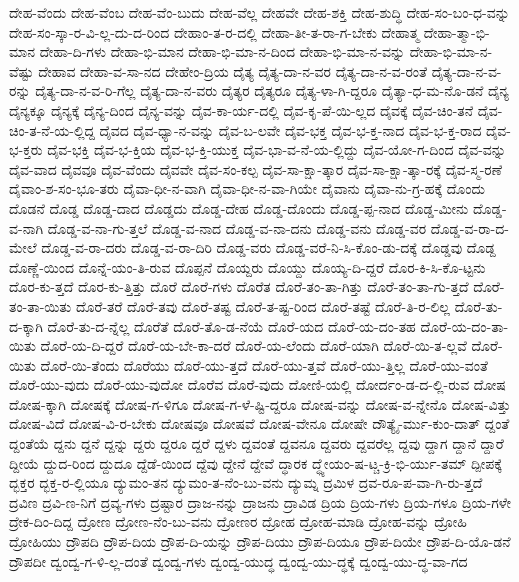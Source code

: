 {ದೇಹ-ವೆಂದು
ದೇಹ-ವೆಂಬ
ದೇಹ-ವೆಂ-ಬುದು
ದೇಹ-ವೆಲ್ಲ
ದೇಹವೇ
ದೇಹ-ಶಕ್ತಿ
ದೇಹ-ಶುದ್ಧಿ
ದೇಹ-ಸಂ-ಬಂ-ಧ-ವನ್ನು
ದೇಹ-ಸಂ-ಸ್ಕಾ-ರ-ವಿ-ಲ್ಲ-ದು-ದ-ರಿಂದ
ದೇಹಾಂ-ತ-ರ-ದಲ್ಲಿ
ದೇಹಾ-ತೀ-ತ-ರಾ-ಗ-ಬೇಕು
ದೇಹಾತ್ಮ
ದೇಹಾ-ತ್ಮಾ-ಭಿ-ಮಾನ
ದೇಹಾ-ದಿ-ಗಳು
ದೇಹಾ-ಭಿ-ಮಾನ
ದೇಹಾ-ಭಿ-ಮಾ-ನ-ದಿಂದ
ದೇಹಾ-ಭಿ-ಮಾ-ನ-ವನ್ನು
ದೇಹಾ-ಭಿ-ಮಾ-ನ-ವೆಷ್ಟು
ದೇಹಾವ
ದೇಹಾ-ವ-ಸಾ-ನದ
ದೇಹೇಂ-ದ್ರಿಯ
ದೈತ್ಯ
ದೈತ್ಯ-ದಾ-ನ-ವರ
ದೈತ್ಯ-ದಾ-ನ-ವ-ರಂತೆ
ದೈತ್ಯ-ದಾ-ನ-ವ-ರನ್ನು
ದೈತ್ಯ-ದಾ-ನ-ವ-ರಿ-ಗೆಲ್ಲ
ದೈತ್ಯ-ದಾ-ನ-ವರು
ದೈತ್ಯರ
ದೈತ್ಯರೂ
ದೈತ್ಯ-ಳಾ-ಗಿ-ದ್ದರೂ
ದೈತ್ಯಾ-ಧ-ಮ-ನೊ-ಡನೆ
ದೈನ್ಯ
ದೈನ್ಯಕ್ಕೂ
ದೈನ್ಯಕ್ಕೆ
ದೈನ್ಯ-ದಿಂದ
ದೈನ್ಯ-ವನ್ನು
ದೈವ-ಕಾ-ರ್ಯ-ದಲ್ಲಿ
ದೈವ-ಕೃ-ಪೆ-ಯಿ-ಲ್ಲದ
ದೈವಕ್ಕೆ
ದೈವ-ಚಿಂ-ತನೆ
ದೈವ-ಚಿಂ-ತ-ನೆ-ಯ-ಲ್ಲಿದ್ದ
ದೈವದ
ದೈವ-ಧ್ಯಾ-ನ-ವನ್ನು
ದೈವ-ಬ-ಲವೇ
ದೈವ-ಭಕ್ತ
ದೈವ-ಭ-ಕ್ತ-ನಾದ
ದೈವ-ಭ-ಕ್ತ-ರಾದ
ದೈವ-ಭ-ಕ್ತರು
ದೈವ-ಭಕ್ತಿ
ದೈವ-ಭ-ಕ್ತಿಯ
ದೈವ-ಭ-ಕ್ತಿ-ಯುಕ್ತ
ದೈವ-ಭಾ-ವ-ನೆ-ಯ-ಲ್ಲಿದ್ದು
ದೈವ-ಯೋ-ಗ-ದಿಂದ
ದೈವ-ವನ್ನು
ದೈವ-ವಾದ
ದೈವವೂ
ದೈವ-ವೆಂದು
ದೈವವೇ
ದೈವ-ಸಂ-ಕಲ್ಪ
ದೈವ-ಸಾ-ಕ್ಷಾ-ತ್ಕಾರ
ದೈವ-ಸಾ-ಕ್ಷಾ-ತ್ಕಾ-ರಕ್ಕೆ
ದೈವ-ಸ್ಮ-ರಣೆ
ದೈವಾಂ-ಶ-ಸಂ-ಭೂ-ತರು
ದೈವಾ-ಧೀ-ನ-ವಾಗಿ
ದೈವಾ-ಧೀ-ನ-ವಾ-ಗಿಯೇ
ದೈವಾನು
ದೈವಾ-ನು-ಗ್ರ-ಹಕ್ಕೆ
ದೊಂದು
ದೊಡನೆ
ದೊಡ್ಡ
ದೊಡ್ಡ-ದಾದ
ದೊಡ್ಡದು
ದೊಡ್ಡ-ದೇಹ
ದೊಡ್ಡ-ದೊಂದು
ದೊಡ್ಡ-ಪ್ಪ-ನಾದ
ದೊಡ್ಡ-ಮೀನು
ದೊಡ್ಡ-ವ-ನಾಗಿ
ದೊಡ್ಡ-ವ-ನಾ-ಗು-ತ್ತಲೆ
ದೊಡ್ಡ-ವ-ನಾದ
ದೊಡ್ಡ-ವ-ನಾ-ದನು
ದೊಡ್ಡ-ವನು
ದೊಡ್ಡ-ವರ
ದೊಡ್ಡ-ವ-ರಾ-ದ-ಮೇಲೆ
ದೊಡ್ಡ-ವ-ರಾ-ದರು
ದೊಡ್ಡ-ವ-ರಾ-ದಿರಿ
ದೊಡ್ಡ-ವರು
ದೊಡ್ಡ-ವರೆ-ನಿ-ಸಿ-ಕೊಂ-ಡು-ದಕ್ಕೆ
ದೊಡ್ಡವು
ದೊಡ್ದ
ದೊಣ್ಣೆ-ಯಿಂದ
ದೊನ್ನೆ-ಯಂ-ತಿ-ರುವ
ದೊಪ್ಪನೆ
ದೊಯ್ದರು
ದೊಯ್ದು
ದೊಯ್ಯ-ದಿ-ದ್ದರೆ
ದೊರ-ಕಿ-ಸಿ-ಕೊ-ಟ್ಟನು
ದೊರ-ಕು-ತ್ತದೆ
ದೊರ-ಕು-ತ್ತಿತ್ತು
ದೊರೆ
ದೊರೆ-ಗಳು
ದೊರೆತ
ದೊರೆ-ತಂ-ತಾ-ಗಿತ್ತು
ದೊರೆ-ತಂ-ತಾ-ಗು-ತ್ತದೆ
ದೊರೆ-ತಂ-ತಾ-ಯಿತು
ದೊರೆ-ತರೆ
ದೊರೆ-ತವು
ದೊರೆ-ತಷ್ಟ
ದೊರೆ-ತ-ಷ್ಟ-ರಿಂದ
ದೊರೆ-ತಷ್ಟೆ
ದೊರೆ-ತಿ-ರ-ಲಿಲ್ಲ
ದೊರೆ-ತು-ದ-ಕ್ಕಾಗಿ
ದೊರೆ-ತು-ದ-ನ್ನೆಲ್ಲ
ದೊರೆತೆ
ದೊರೆ-ತೊ-ಡ-ನೆಯೆ
ದೊರೆ-ಯದ
ದೊರೆ-ಯ-ದಂ-ತಹ
ದೊರೆ-ಯ-ದಂ-ತಾ-ಯಿತು
ದೊರೆ-ಯ-ದಿ-ದ್ದರೆ
ದೊರೆ-ಯ-ಬೇ-ಕಾ-ದರೆ
ದೊರೆ-ಯ-ಲೆಂದು
ದೊರೆ-ಯಾಗಿ
ದೊರೆ-ಯಿ-ತ-ಲ್ಲವೆ
ದೊರೆ-ಯಿತು
ದೊರೆ-ಯಿ-ತೆಂದು
ದೊರೆಯು
ದೊರೆ-ಯು-ತ್ತದೆ
ದೊರೆ-ಯು-ತ್ತವೆ
ದೊರೆ-ಯು-ತ್ತಿಲ್ಲ
ದೊರೆ-ಯು-ವಂತೆ
ದೊರೆ-ಯು-ವುದು
ದೊರೆ-ಯು-ವುದೋ
ದೊರೆವ
ದೊರೆ-ವುದು
ದೋಣಿ-ಯಲ್ಲಿ
ದೋರ್ದಂ-ಡ-ದ-ಲ್ಲಿ-ರುವ
ದೋಷ
ದೋಷ-ಕ್ಕಾಗಿ
ದೋಷಕ್ಕೆ
ದೋಷ-ಗ-ಳಿಗೂ
ದೋಷ-ಗ-ಳೆ-ಷ್ಟಿ-ದ್ದರೂ
ದೋಷ-ವನ್ನು
ದೋಷ-ವ-ನ್ನೇನೊ
ದೋಷ-ವಿತ್ತು
ದೋಷ-ವಿದೆ
ದೋಷ-ವಿ-ರ-ಬೇಕು
ದೋಷವೂ
ದೋಷವೆ
ದೋಷ-ವೇನೂ
ದೋಷೇ
ದೌತ್ಯೈ-ರ್ಮು-ಕುಂ-ದಾತ್
ದ್ದಂತೆ
ದ್ದಂತೆಯೆ
ದ್ದನು
ದ್ದನೆ
ದ್ದನ್ನು
ದ್ದರು
ದ್ದರೂ
ದ್ದರೆ
ದ್ದಳು
ದ್ದವಂತೆ
ದ್ದವನೂ
ದ್ದವರು
ದ್ದವರೆಲ್ಲ
ದ್ದವು
ದ್ದಾಗ
ದ್ದಾನೆ
ದ್ದಾರೆ
ದ್ದೀಯೆ
ದ್ದುದ-ರಿಂದ
ದ್ದುದೂ
ದ್ದೆಡೆ-ಯಿಂದ
ದ್ದೆವು
ದ್ದೇನೆ
ದ್ದೇವೆ
ದ್ಧಾರಕ
ದ್ಧ್ಯೇಯಂ-ಷ-ಟ್ಚ-ಕ್ರಿ-ಭಿ-ರ್ಯು-ತಮ್
ದ್ಪೀಪಕ್ಕೆ
ದ್ಭಕ್ತರ
ದ್ಭಕ್ತ-ರ-ಲ್ಲಿಯೂ
ದ್ಯುಮಂ-ತನ
ದ್ಯುಮಂ-ತ-ನೆಂ-ಬು-ವನು
ದ್ಯುಮ್ನ
ದ್ರಮಿಳ
ದ್ರವ-ರೂ-ಪ-ವಾ-ಗಿ-ರು-ತ್ತದೆ
ದ್ರವಿಣ
ದ್ರವಿ-ಣ-ನಿಗೆ
ದ್ರವ್ಯ-ಗಳು
ದ್ರಷ್ಟಾರ
ದ್ರಾಜ-ನನ್ನು
ದ್ರಾಜನು
ದ್ರಾವಿಡ
ದ್ರಿಯ
ದ್ರಿಯ-ಗಳು
ದ್ರಿಯ-ಗಳೂ
ದ್ರಿಯ-ಗಳೇ
ದ್ರೇಕ-ದಿಂ-ದಿದ್ದ
ದ್ರೋಣ
ದ್ರೋಣ-ನೆಂ-ಬು-ವನು
ದ್ರೋಣರ
ದ್ರೋಹ
ದ್ರೋಹ-ಮಾಡಿ
ದ್ರೋಹ-ವನ್ನು
ದ್ರೋಹಿ
ದ್ರೋಹಿಯು
ದ್ರೌಪದಿ
ದ್ರೌಪ-ದಿಯ
ದ್ರೌಪ-ದಿ-ಯನ್ನು
ದ್ರೌಪ-ದಿಯು
ದ್ರೌಪ-ದಿಯೂ
ದ್ರೌಪ-ದಿಯೇ
ದ್ರೌಪ-ದಿ-ಯೊ-ಡನೆ
ದ್ರೌಪದೀ
ದ್ವಂದ್ವ-ಗ-ಳಿ-ಲ್ಲ-ದಂತೆ
ದ್ವಂದ್ವ-ಗಳು
ದ್ವಂದ್ವ-ಯುದ್ಧ
ದ್ವಂದ್ವ-ಯು-ದ್ಧಕ್ಕೆ
ದ್ವಂದ್ವ-ಯು-ದ್ಧ-ವಾ-ಗದ
}
